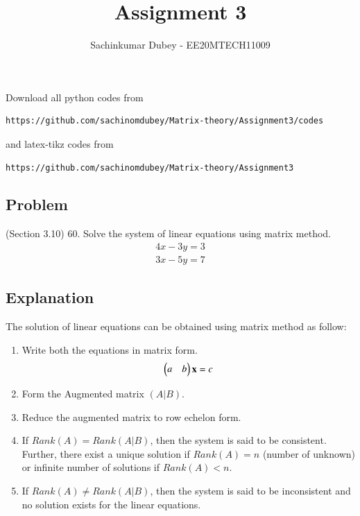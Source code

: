 \documentclass[journal,12pt,twocolumn]{IEEEtran}
\begin{document}
\def\putbox#1#2#3{\makebox[0in][l]{\makebox[#1][l]{}\raisebox{\baselineskip}[0in][0in]{\raisebox{#2}[0in][0in]{#3}}}}
     \def\rightbox#1{\makebox[0in][r]{#1}}
     \def\centbox#1{\makebox[0in]{#1}}
     \def\topbox#1{\raisebox{-\baselineskip}[0in][0in]{#1}}
     \def\midbox#1{\raisebox{-0.5\baselineskip}[0in][0in]{#1}}
\vspace{3cm}
\title{Assignment 3}
\author{Sachinkumar Dubey - EE20MTECH11009}

\maketitle
\newpage
\bigskip
\renewcommand{\thefigure}{\theenumi}
\renewcommand{\thetable}{\theenumi}
Download all python codes from 
\begin{lstlisting}
https://github.com/sachinomdubey/Matrix-theory/Assignment3/codes
\end{lstlisting}
%
and latex-tikz codes from 
%
\begin{lstlisting}
https://github.com/sachinomdubey/Matrix-theory/Assignment3
\end{lstlisting}
\subsection{Problem}
(Section 3.10) 60. Solve the system of linear equations using matrix method.
\begin{align}
    4x-3y=3 \\
    3x-5y=7
\end{align}
\subsection{Explanation}
The solution of linear equations can be obtained using matrix method as follow:
\begin{enumerate}
\item Write both the equations in matrix form.
\begin{align}
    \begin{pmatrix}a & b\end{pmatrix}\mathbf{x}=c
\end{align}
    \item Form the Augmented matrix $(A|B)$.
    \item Reduce the augmented matrix to row echelon form.
    \item If $Rank(A)=Rank(A|B)$, then the system is said to be consistent. Further, there exist a unique solution if $Rank(A)=n$ (number of unknown) or infinite number of solutions if $Rank(A)<n$.
    \item If $Rank(A)\neq Rank(A|B)$, then the system is said to be inconsistent and no solution exists for the linear equations.
\end{enumerate}
\end{document}
